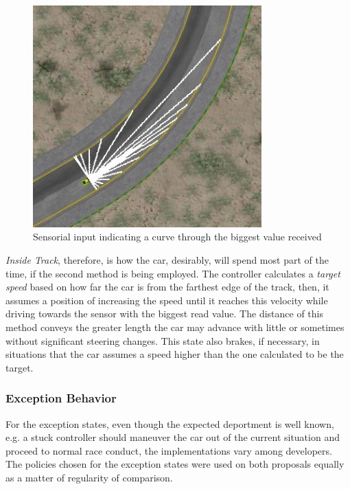 	\begin{figure}[h]
		
		\centering
		\includegraphics[width=250pt]{FarthestSensor}
		\caption{Sensorial input indicating a curve through the biggest value received}
		\label{Fig:FSensor}
		
	\end{figure}
	
	\emph{Inside Track}, therefore, is how the car, desirably, will spend most part of the time, if the second method is being employed. The controller calculates a \emph{target speed} based on how far the car is from the farthest edge of the track, then, it assumes a position of increasing the speed until it reaches this velocity while driving towards the sensor with the biggest read value. The distance of this method conveys the greater length the car may advance with little or sometimes without significant steering changes. This state also brakes, if necessary, in situations that the car assumes a speed higher than the one calculated to be the target.
	
\subsubsection{Exception Behavior}
	
	For the exception states, even though the expected deportment is well known, e.g. a stuck controller should maneuver the car out of the current situation and proceed to normal race conduct, the implementations vary among developers. The policies chosen for the exception states were used on both proposals equally as a matter of regularity of comparison.
	
